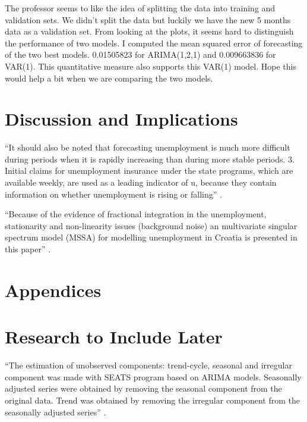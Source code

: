 \documentclass[twoside,twocolumn]{article}
\begin{document}
The professor seems to like the idea of splitting the data into training and validation sets. We didn't split the data but luckily we have the new 5 months data as a validation set. From looking at the plots, it seems hard to distinguish the performance of two models. I computed the mean squared error of forecasting of the two best models. 0.01505823 for ARIMA(1,2,1) and 0.009663836 for VAR(1). This quantitative measure also supports this VAR(1) model. Hope this would help a bit when we are comparing the two models.  

\section{Discussion and Implications}

``It should also be noted that forecasting unemployment is much more difficult during periods when it is rapidly increasing than during more stable periods. 3. Initial claims for unemployment insurance under the
state programs, which are available weekly, are used as a leading indicator of u, because they contain information on whether unemployment is rising or falling'' \citep{Montgomery1998}. 

``Because of the evidence of fractional integration in the unemployment, stationarity and non-linearity issues (background noise) an multivariate singular spectrum model (MSSA) for modelling unemployment in Croatia is presented in this paper'' \citep{Skare2015}.



\section{Appendices}
\appendix

\section{Research to Include Later}

``The estimation of unobserved components: trend-cycle, seasonal and irregular component was made with SEATS program based on ARIMA models. Seasonally adjusted series were obtained by removing the seasonal component from the original data. Trend was obtained by removing the irregular component from the seasonally adjusted series'' \citep{VOINEAGU2012}.
\end{document}
